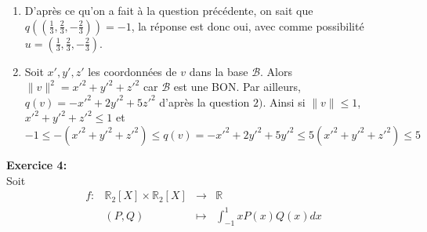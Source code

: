 \documentclass[a4paper, 11pt]{article}
\theoremstyle{plain}
\newcommand{\R}{\mathbb{R}}
\begin{document}
\begin{enumerate}
\item D'après ce qu'on a fait à la question précédente, on sait 
que 
$q( ( \frac{1}{3}, \frac{2}{3}, -\frac{2}{3}) ) =-1$, la réponse est donc oui, avec comme 
possibilité 
$u=(\frac{1}{3}, \frac{2}{3}, -\frac{2}{3})$. 

\item 
Soit 
$x',y',z'$ les coordonnées de $v$ dans la base 
$\mathcal{B}$.
Alors 
$\|v\|^2 = x'^2 +y'^2 +z'^2$ car 
$\mathcal{B}$ est une BON. 
Par ailleurs, 
$q(v) = -x'^2 +2y'^2 +5z'^2$ d'après la question $2)$. 
Ainsi si $\|v\| \leq 1$, 
$x'^2 +y'^2+z'^2 \leq 1$ et
 \[-1 \leq -(x'^2+y'^2+z'^2) \leq q(v) =  -x'^2 +2y'^2 +5y'^2 \leq 5(x'^2+y'^2+z'^2) \leq 5\]

\end{enumerate}

\bigskip
\noindent
\textbf{Exercice 4:}\\
Soit 
\[
\begin{array}{cccc}
f : & \R_2[X]\times \R_2[X] & \to & \R \\
    &  (P,Q)  & \mapsto & \int_{-1}^1 xP(x)Q(x)dx
    \end{array}
    \]
    
\end{document}

